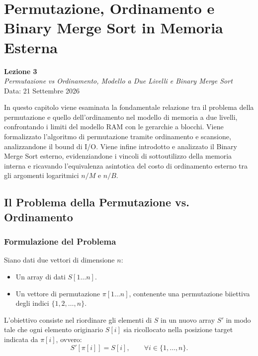 \chapter{Permutazione, Ordinamento e Binary Merge Sort in Memoria Esterna}
\label{cha:lecture-three}

\begin{center}
  \textbf{Lezione 3}\\
  \emph{Permutazione vs Ordinamento, Modello a Due Livelli e Binary Merge Sort}\\[0.5em]
  Data: 21 Settembre 2026
\end{center}

In questo capitolo viene esaminata la fondamentale relazione tra il problema della permutazione e quello dell'ordinamento nel modello di memoria a due livelli, confrontando i limiti del modello RAM con le gerarchie a blocchi. Viene formalizzato l'algoritmo di permutazione tramite ordinamento e scansione, analizzandone il bound di I/O. Viene infine introdotto e analizzato il Binary Merge Sort esterno, evidenziandone i vincoli di sottoutilizzo della memoria interna e ricavando l'equivalenza asintotica del costo di ordinamento esterno tra gli argomenti logaritmici $n/M$ e $n/B$.

\section{Il Problema della Permutazione vs. Ordinamento}
\label{sec:permutation-vs-sorting}

\subsection{Formulazione del Problema}
\label{subsec:problem-formulation}

Siano dati due vettori di dimensione $n$:
\begin{itemize}
  \item Un array di dati $S[1 \dots n]$.
  \item Un vettore di permutazione $\pi[1 \dots n]$, contenente una permutazione biiettiva degli indici $\{1, 2, \dots, n\}$.
\end{itemize}

L'obiettivo consiste nel riordinare gli elementi di $S$ in un nuovo array $S'$ in modo tale che ogni elemento originario $S[i]$ sia ricollocato nella posizione target indicata da $\pi[i]$, ovvero:
\begin{equation}
  S'[\pi[i]] = S[i], \qquad \forall i \in \{1, \dots, n\}.
\end{equation}

